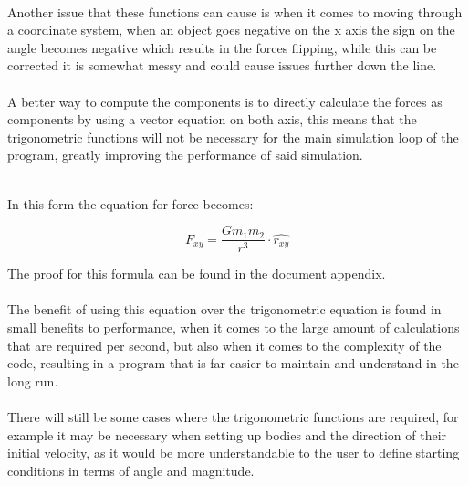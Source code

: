 \paragraph{}
Another issue that these functions can cause is when it comes to moving through a coordinate system, when an object goes negative on the x axis the sign on the angle becomes negative which results in the forces flipping, while this can be corrected it is somewhat messy and could cause issues further down the line.

\paragraph{}
A better way to compute the components is to directly calculate the forces as components by using a vector equation on both axis, this means that the trigonometric functions will not be necessary for the main simulation loop of the program, greatly improving the performance of said simulation.\\\

In this form the equation for force becomes:

$$F_{xy}=\frac{Gm_1m_2}{r^3} \cdot \hat{r_{xy}}$$

The proof for this formula can be found in the document appendix.

\paragraph{}
The benefit of using this equation over the trigonometric equation is found in small benefits to performance, when it comes to the large amount of calculations that are required per second, but also when it comes to the complexity of the code, resulting in a program that is far easier to maintain and understand in the long run.

\paragraph{}
There will still be some cases where the trigonometric functions are required, for example it may be necessary when setting up bodies and the direction of their initial velocity, as it would be more understandable to the user to define starting conditions in terms of angle and magnitude.